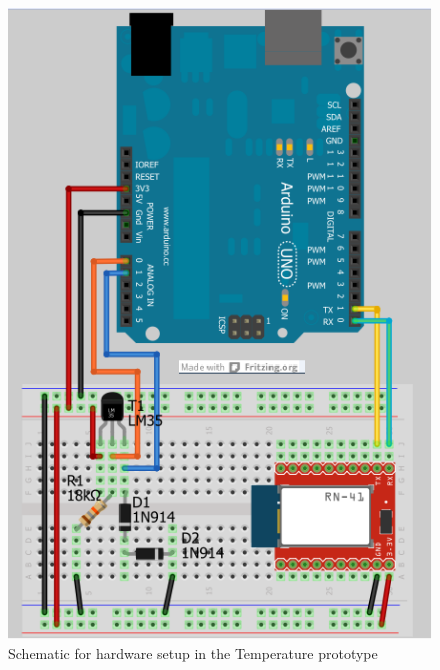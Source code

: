 \begin{figure}[h!]
	\centering
	\includegraphics[scale=0.5]{img/tempapp-schematic}
	\caption{Schematic for hardware setup in the Temperature prototype}
	\label{fig:design-temperature-schematic}
\end{figure}
	
